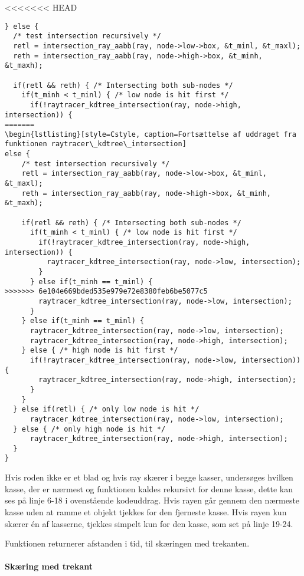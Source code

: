 <<<<<<< HEAD
\begin{lstlisting}[style=Cstyle, caption=else (recursive)]
 } else {
  /* test intersection recursively */
  retl = intersection_ray_aabb(ray, node->low->box, &t_minl, &t_maxl);
  reth = intersection_ray_aabb(ray, node->high->box, &t_minh, &t_maxh);

  if(retl && reth) { /* Intersecting both sub-nodes */
    if(t_minh < t_minl) { /* low node is hit first */
      if(!raytracer_kdtree_intersection(ray, node->high, intersection)) {
=======
\begin{lstlisting}[style=Cstyle, caption=Fortsættelse af uddraget fra funktionen raytracer\_kdtree\_intersection]
else {
    /* test intersection recursively */
    retl = intersection_ray_aabb(ray, node->low->box, &t_minl, &t_maxl);
    reth = intersection_ray_aabb(ray, node->high->box, &t_minh, &t_maxh);

    if(retl && reth) { /* Intersecting both sub-nodes */
      if(t_minh < t_minl) { /* low node is hit first */
        if(!raytracer_kdtree_intersection(ray, node->high, intersection)) {
          raytracer_kdtree_intersection(ray, node->low, intersection);
        }
      } else if(t_minh == t_minl) {
>>>>>>> 6e104e669bded535e979e72e8380feb6be5077c5
        raytracer_kdtree_intersection(ray, node->low, intersection);
      }
    } else if(t_minh == t_minl) {
      raytracer_kdtree_intersection(ray, node->low, intersection);
      raytracer_kdtree_intersection(ray, node->high, intersection);
    } else { /* high node is hit first */
      if(!raytracer_kdtree_intersection(ray, node->low, intersection)) {
        raytracer_kdtree_intersection(ray, node->high, intersection);
      }
    }
  } else if(retl) { /* only low node is hit */
      raytracer_kdtree_intersection(ray, node->low, intersection);
  } else { /* only high node is hit */
      raytracer_kdtree_intersection(ray, node->high, intersection);
  }
}
\end{lstlisting}

Hvis roden ikke er et blad og hvis ray skærer i begge kasser, undersøges hvilken kasse, der er nærmest og funktionen kaldes rekursivt for denne kasse, dette kan ses på linje 6-18 i ovenstående kodeuddrag. Hvis rayen går gennem den nærmeste kasse uden at ramme et objekt tjekkes for den fjerneste kasse. Hvis rayen kun skærer én af kasserne, tjekkes simpelt kun for den kasse, som set på linje 19-24.

Funktionen returnerer afstanden i tid, til skæringen med trekanten.

\paragraph{Skæring med trekant}

